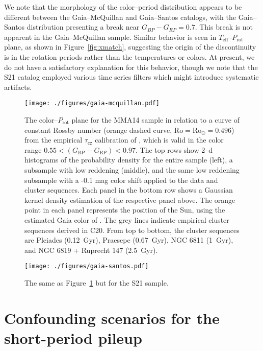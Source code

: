\documentclass[trackchanges,twocolumn]{aastex631}
\newcommand{\taucz}{$\tau_\mathrm{cz}$\xspace}
\newcommand{\mma}{MMA14\xspace}
\newcommand{\curtis}{C20\xspace}
\newcommand{\santos}{S21\xspace}
\newcommand{\teff}{\ensuremath{T_{\mathrm{eff}}}\xspace}
\newcommand{\prot}{\ensuremath{P_\mathrm{rot}}\xspace}
\begin{document}
We note that the morphology of the color–period distribution appears to be different between the Gaia–McQuillan and Gaia–Santos catalogs, with the Gaia–Santos distribution presenting a break near $G_{BP}-G_{RP}= 0.7$. This break is not apparent in the Gaia–McQuillan sample. Similar behavior is seen in \teff–\prot plane, as shown in Figure~\ref{fig:xmatch}, suggesting the origin of the discontinuity is in the rotation periods rather than the temperatures or colors. At present, we do not have a satisfactory explanation for this behavior, though we note that the \santos catalog employed various time series filters which might introduce systematic artifacts.


\begin{figure}
    \texttt{[image: ./figures/gaia-mcquillan.pdf]}
    \caption{The color–\prot plane for the \mma sample in relation to a curve of constant Rossby number (orange dashed curve, $\mathrm{Ro} = \mathrm{Ro}_\odot = 0.496$) from the empirical \taucz calibration of \citet{Corsaro2021}, which is valid in the color range $0.55 < (G_\mathrm{BP}−G_\mathrm{RP}) < 0.97$. The top rows show 2–d histograms of the probability density for the entire sample (left), a subsample with low reddening (middle), and the same low reddening subsample with a -0.1 mag color shift applied to the data and cluster sequences. Each panel in the bottom row shows a Gaussian kernel density estimation of the respective panel above. The orange point in each panel represents the position of the Sun, using the estimated Gaia color of \citet{Casagrande2018}. The grey lines indicate empirical cluster sequences derived in \curtis. From top to bottom, the cluster sequences are Pleiades (0.12~Gyr), Praesepe (0.67~Gyr), NGC 6811 (1~Gyr), and NGC 6819 + Ruprecht 147 (2.5~Gyr).}
    \label{fig:gaia-mcquillan}
\end{figure}


\begin{figure}
    \texttt{[image: ./figures/gaia-santos.pdf]}
    \caption{The same as Figure~\ref{fig:gaia-mcquillan} but for the \santos sample.}
    \label{fig:gaia-santos}
\end{figure}

\section{Confounding scenarios for the short-period pileup}\label{app:harmonics}
\end{document}
